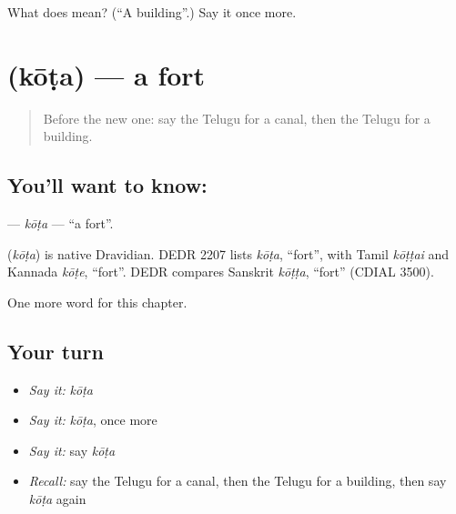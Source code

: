 \begin{tcolorbox}[breakable,colback=teal!4,colframe=teal!35!black,title={Before you move on}]
What does  mean? (\textquotedblleft{}A building\textquotedblright{}.) Say it once more.
\end{tcolorbox}
\section[\texorpdfstring{\te{కోట} (kōṭa)}{కోట (kōṭa)}]{ (kōṭa) — a fort}

\label{lesson:TE-C292-kota}



\begin{quote}
Before the new one: say the Telugu for a canal, then the Telugu for a building.
\end{quote}

\subsection*{You'll want to know: }
\textbf{} — \emph{kōṭa} — \textquotedblleft{}a fort\textquotedblright{}.

\begin{cousinweb}
\textbf{} (\emph{kōṭa}) is native Dravidian. DEDR 2207 lists \emph{kōṭa}, \textquotedblleft{}fort\textquotedblright{}, with Tamil \emph{kōṭṭai} and Kannada \emph{kōṭe}, \textquotedblleft{}fort\textquotedblright{}. DEDR compares Sanskrit \emph{kōṭṭa}, \textquotedblleft{}fort\textquotedblright{} (CDIAL 3500).
\end{cousinweb}

\begin{grammarlens}[title={What you've built}]
One more word for this chapter.
\end{grammarlens}

\subsection*{Your turn}
\begin{itemize}
\raggedright
  \item \emph{Say it:} \emph{kōṭa}
  \item \emph{Say it:} \emph{kōṭa}, once more
  \item \emph{Say it:} say \emph{kōṭa}
  \item \emph{Recall:} say the Telugu for a canal, then the Telugu for a building, then say \emph{kōṭa} again
\end{itemize}

